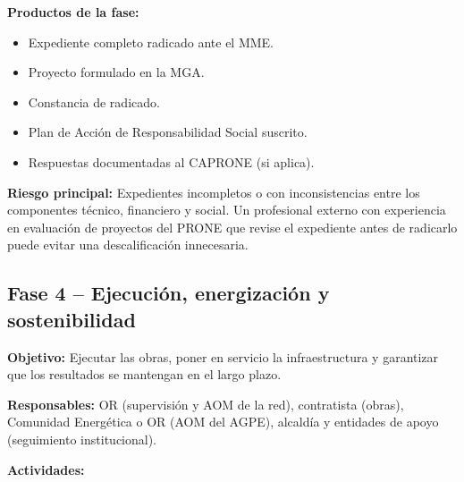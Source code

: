 \textbf{Productos de la fase:}
\begin{itemize}
    \item Expediente completo radicado ante el MME.
    \item Proyecto formulado en la MGA.
    \item Constancia de radicado.
    \item Plan de Acción de Responsabilidad Social suscrito.
    \item Respuestas documentadas al CAPRONE (si aplica).
\end{itemize}

\textbf{Riesgo principal:} Expedientes incompletos o con inconsistencias
entre los componentes técnico, financiero y social. Un profesional
externo con experiencia en evaluación de proyectos del PRONE que revise
el expediente antes de radicarlo puede evitar una descalificación
innecesaria.

\subsection{Fase 4 -- Ejecución, energización y sostenibilidad}
\label{subsec:fase4}

\textbf{Objetivo:} Ejecutar las obras, poner en servicio la
infraestructura y garantizar que los resultados se mantengan en el
largo plazo.

\textbf{Responsables:} OR (supervisión y AOM de la red), contratista
(obras), Comunidad Energética o OR (AOM del AGPE), alcaldía y entidades
de apoyo (seguimiento institucional).

\textbf{Actividades:}

